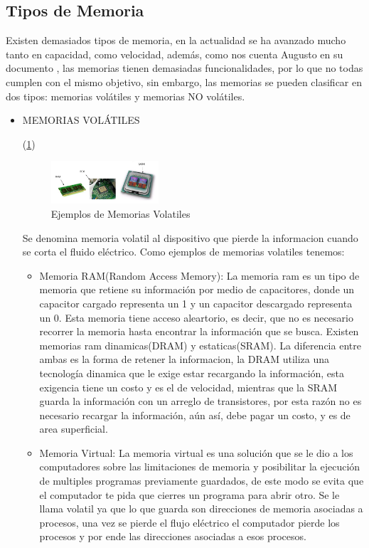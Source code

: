 \documentclass{article}
\begin{document}
\subsection{Tipos de Memoria}\label{pregunta2}
Existen demasiados tipos de memoria, en la actualidad se ha avanzado mucho tanto en capacidad, como velocidad, además, como nos cuenta Augusto en su documento \cite{referencia}, las memorias tienen demasiadas funcionalidades, por lo que no todas cumplen con el mismo objetivo, sin embargo, las memorias se pueden clasificar en dos tipos: memorias volátiles y memorias NO volátiles.
\begin{itemize}
    \item
    MEMORIAS VOLÁTILES
    
    (\ref{fig:volatil})

    \begin{figure}[h]
    \includegraphics[width=4cm]{Volatiles.jpeg}
    \centering
    \caption{Ejemplos de Memorias Volatiles}
    \label{fig:volatil}
    \end{figure}
    
    Se denomina memoria volatil al dispositivo que pierde la informacion cuando se corta el fluido eléctrico. Como ejemplos de memorias volatiles tenemos:
    \begin{itemize}
        \item
        Memoria RAM(Random Access Memory): La memoria ram es un tipo de memoria que retiene su información por medio de capacitores, donde un capacitor cargado representa un 1 y un capacitor descargado representa un 0. Esta memoria tiene acceso aleartorio, es decir, que no es necesario recorrer la memoria hasta encontrar la información que se busca. Existen memorias ram dinamicas(DRAM) y estaticas(SRAM). La diferencia entre ambas es la forma de retener la informacion, la DRAM  utiliza una tecnología dinamica que le exige estar recargando la información, esta exigencia tiene un costo y es el de velocidad, mientras que la SRAM guarda la información con un arreglo de transistores, por esta razón no es necesario recargar la información, aún así, debe pagar un costo, y es de area superficial.
        
        \item
        Memoria Virtual: La memoria virtual es una solución que se le dio a los computadores sobre las limitaciones de memoria y posibilitar la ejecución de multiples programas previamente guardados, de este modo se evita que el computador te pida que cierres un programa para abrir otro. Se le llama volatil ya que lo que guarda son direcciones de memoria asociadas a procesos, una vez se pierde el flujo eléctrico el computador pierde los procesos y por ende las direcciones asociadas a esos procesos.
        

\end{itemize}
\end{itemize}
\end{document}
